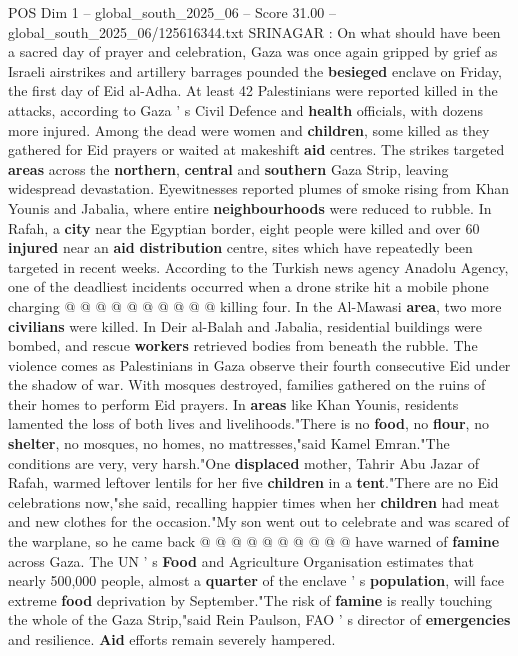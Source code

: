 \begin{textsample}{POS Dim 1 – global\_south\_2025\_06 – Score 31.00 – global\_south\_2025\_06/125616344.txt}  \label{ex:f1_pos_138}
SRINAGAR : On what should have been a sacred day of prayer and celebration, Gaza was once again gripped by grief as Israeli airstrikes and artillery barrages pounded the \textbf{besieged} enclave on Friday, the first day of Eid al-Adha.
At least 42 Palestinians were reported killed in the attacks, according to Gaza ' s Civil Defence and \textbf{health} officials, with dozens more injured.
Among the dead were women and \textbf{children}, some killed as they gathered for Eid prayers or waited at makeshift \textbf{aid} centres.
The strikes targeted \textbf{areas} across the \textbf{northern}, \textbf{central} and \textbf{southern} Gaza Strip, leaving widespread devastation.
Eyewitnesses reported plumes of smoke rising from Khan Younis and Jabalia, where entire \textbf{neighbourhoods} were reduced to rubble.
In Rafah, a \textbf{city} near the Egyptian border, eight people were killed and over 60 \textbf{injured} near an \textbf{aid} \textbf{distribution} centre, sites which have repeatedly been targeted in recent weeks.
According to the Turkish news agency Anadolu Agency, one of the deadliest incidents occurred when a drone strike hit a mobile phone charging @ @ @ @ @ @ @ @ @ @ killing four.
In the Al-Mawasi \textbf{area}, two more \textbf{civilians} were killed.
In Deir al-Balah and Jabalia, residential buildings were bombed, and rescue \textbf{workers} retrieved bodies from beneath the rubble.
The violence comes as Palestinians in Gaza observe their fourth consecutive Eid under the shadow of war.
With mosques destroyed, families gathered on the ruins of their homes to perform Eid prayers.
In \textbf{areas} like Khan Younis, residents lamented the loss of both lives and livelihoods."There is no \textbf{food}, no \textbf{flour}, no \textbf{shelter}, no mosques, no homes, no mattresses,"said Kamel Emran."The conditions are very, very harsh."One \textbf{displaced} mother, Tahrir Abu Jazar of Rafah, warmed leftover lentils for her five \textbf{children} in a \textbf{tent}."There are no Eid celebrations now,"she said, recalling happier times when her \textbf{children} had meat and new clothes for the occasion."My son went out to celebrate and was scared of the warplane, so he came back @ @ @ @ @ @ @ @ @ @ have warned of \textbf{famine} across Gaza.
The UN ' s \textbf{Food} and Agriculture Organisation estimates that nearly 500,000 people, almost a \textbf{quarter} of the enclave ' s \textbf{population}, will face extreme \textbf{food} deprivation by September."The risk of \textbf{famine} is really touching the whole of the Gaza Strip,"said Rein Paulson, FAO ' s director of \textbf{emergencies} and resilience. \textbf{Aid} efforts remain severely hampered.

\end{textsample}
